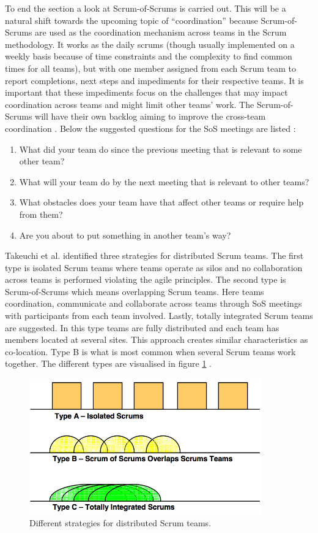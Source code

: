 To end the section a look at Scrum-of-Scrums is carried out. This will be a natural shift towards the upcoming topic of ``coordination'' because Scrum-of-Scrums are used as the coordination mechanism across teams in the Scrum methodology. It works as the daily scrums (though usually implemented on a weekly basis because of time constraints and the complexity to find common times for all teams), but with one member assigned from each Scrum team to report completions, next steps and impediments for their respective teams. It is important that these impediments focus on the challenges that may impact coordination across teams and might limit other teams' work. The Scrum-of-Scrums will have their own backlog aiming to improve the cross-team coordination \cite{Sutherland2001}. Below the suggested questions for the SoS meetings are listed \cite{Cohn2007}:

\begin{enumerate}
  \item What did your team do since the previous meeting that is relevant to some other team?
  \item What will your team do by the next meeting that is relevant to other teams?
  \item What obstacles does your team have that affect other teams or require help from them?
  \item Are you about to put something in another team's way?
\end{enumerate}

Takeuchi et al. identified three strategies for distributed Scrum teams. The first type is isolated Scrum teams where teams operate as silos and no collaboration across teams is performed violating the agile principles. The second type is Scrum-of-Scrums which means overlapping Scrum teams. Here teams coordination, communicate and collaborate across teams through SoS meetings with participants from each team involved. Lastly, totally integrated Scrum teams are suggested. In this type teams are fully distributed and each team has members located at several sites. This approach creates similar characteristics as co-location. Type B is what is most common when several Scrum teams work together. The different types are visualised in figure \ref{distributedscrum} \cite{takeuchi2004}.

\begin{figure}
\centering
\includegraphics[width=100mm]{images/distributed_scrum.png}
\caption{Different strategies for distributed Scrum teams.}
\label{distributedscrum}
\end{figure}


